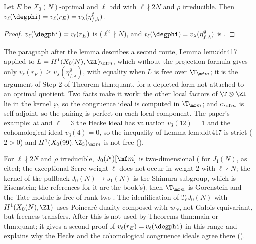 \begin{sloppypar}
\begin{lemma}\label{lem:paper:hecke}
Let $E$ be $X_0(N)$-optimal and $\ell$ odd with $\ell\nmid2N$ and $\bar\rho$ irreducible. Then $v_\ell(\degphi)=v_\ell(r_E)=v_\lambda(\eta^\emptyset_{f,\lambda})$.
\end{lemma}

\begin{proof}[Proof]
$v_\ell(\degphi)=v_\ell(r_E)$ is \cite[Theorem 2.2]{ARS12} ($\ell^2\nmid N$), and $v_\ell(\degphi)=v_\lambda(\eta^\emptyset_{f,\lambda})$ is .
\end{proof}

\noindent The paragraph after the lemma describes a second route, Lemma lem:ddt417 applied to $L=H^1(X_0(N),\Zl)_{\mf m}$, which without the projection formula gives
only $v_\ell(r_E)\ge v_\lambda(\eta^\emptyset_{f,\lambda})$, with equality when $L$ is free over $\T_{\mf m}$; it is the argument of Step 2 of Theorem thm:quant, for a depleted form not
attached to an optimal quotient. Two facts make it work: the other local factors of $\T\otimes\Zl$ lie in the kernel $\wp$, so the congruence ideal is computed in $\T_{\mf m}$; and
$e_{\mf m}$ is self-adjoint, so the pairing is perfect on each local component. The paper's example: at  and $\ell=3$ the Hecke ideal has valuation $v_3(12)=1$ and the cohomological ideal $v_3(4)=0$, so the inequality of Lemma lem:ddt417 is
strict ($2>0$) and $H^1(X_0(99),\Z_3)_{\mf m}$ is not free ().

\begin{remark}\label{rem:paper:free}
For $\ell\nmid2N$ and $\bar\rho$ irreducible, $J_0(N)[\mf m]$ is two-dimensional (\cite[Theorem 3.5]{RibetStein} for $J_1(N)$, as cited; the exceptional Serre weight $\ell$ does not occur
in weight $2$ with $\ell\nmid N$; the kernel of the pullback $J_0(N)\to J_1(N)$ is the Shimura subgroup, which is Eisenstein; the references \cite{LingOesterle,Ribet88} for
it are the book's); then $\T_{\mf m}$ is Gorenstein and the Tate module
is free of rank two \cite{Tilouine97}. The identification of $T_\ell J_0(N)$ with $H^1(X_0(N),\Zl)$ uses Poincar\'e duality composed with $w_N$, not Galois equivariant, but freeness
transfers. After  this is not used by Theorems thm:main or thm:quant; it gives a second proof of $v_\ell(r_E)=v_\ell(\degphi)$ in this range and explains
why the Hecke and the cohomological congruence ideals agree there ().
\end{remark}


\end{sloppypar}
